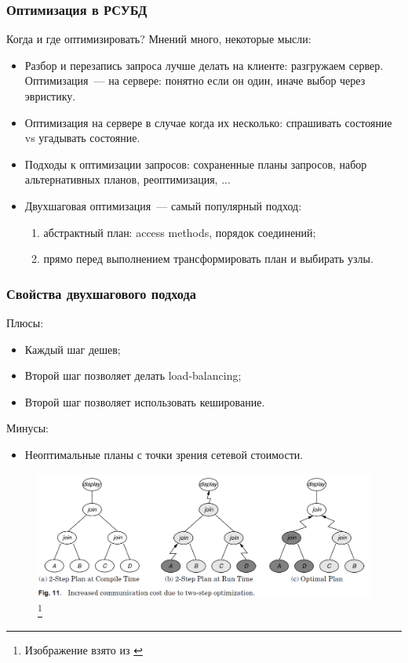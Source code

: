 \documentclass{beamer}
\begin{document}
\begin{frame}
\frametitle{Оптимизация в РСУБД}

Когда и где оптимизировать? Мнений много, некоторые мысли:

\begin{itemize}
  \setlength\itemsep{1em}

  \item Разбор и перезапись запроса лучше делать на клиенте: разгружаем сервер. Оптимизация~--- на сервере: понятно если он один, иначе выбор через эвристику.
  \item Оптимизация на сервере в случае когда их несколько: спрашивать состояние vs угадывать состояние.
  \item Подходы к оптимизации запросов: сохраненные планы запросов, набор альтернативных планов, реоптимизация, ...
  \item Двухшаговая оптимизация~--- самый популярный подход:
  \begin{enumerate}
    \setlength\itemsep{1em}
    \item абстрактный план: access methods, порядок соединений;
    \item прямо перед выполнением трансформировать план и выбирать узлы.
  \end{enumerate}
\end{itemize}


\end{frame}


\begin{frame}
\frametitle{Свойства двухшагового подхода}

Плюсы:
\begin{itemize}

  \item Каждый шаг дешев;
  \item Второй шаг позволяет делать load-balancing;
  \item Второй шаг позволяет использовать кеширование.
\end{itemize}

Минусы:
\begin{itemize}
  \setlength\itemsep{1em}
  \item Неоптимальные планы с точки зрения сетевой стоимости.
\end{itemize}

\begin{figure}[htb]
\includegraphics[width=\textwidth,height=0.65\textheight,keepaspectratio]{kossman-9.png} 
\footnote{\tiny{Изображение взято из \cite{Kossmann2000}}}
 \end{figure}    

\end{frame}
\end{document}
